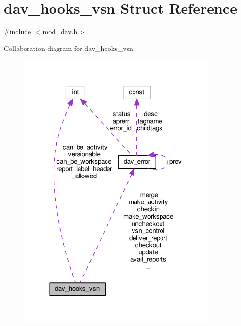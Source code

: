 \hypertarget{structdav__hooks__vsn}{}\section{dav\+\_\+hooks\+\_\+vsn Struct Reference}
\label{structdav__hooks__vsn}


{\ttfamily \#include $<$mod\+\_\+dav.\+h$>$}



Collaboration diagram for dav\+\_\+hooks\+\_\+vsn\+:
\nopagebreak
\begin{figure}[H]
\begin{center}
\leavevmode
\includegraphics[width=282pt]{structdav__hooks__vsn__coll__graph}
\end{center}
\end{figure}
